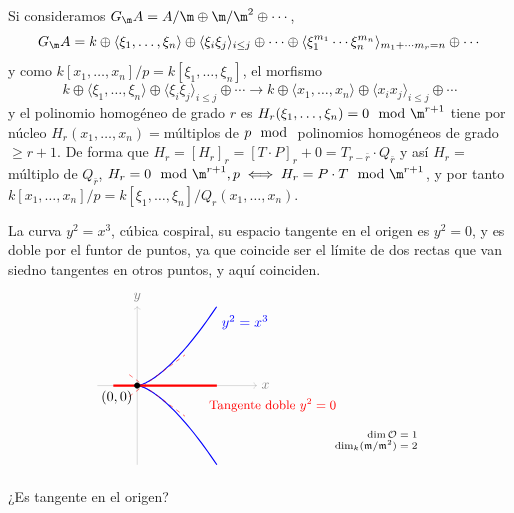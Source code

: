     Si consideramos $G_\m A = A/\m \oplus \m /\m^2 \oplus \cdots $, 
    $$G_\m A = k \oplus \langle \xi_1, \ldots, \xi_n \rangle \oplus \langle \xi_i \xi_j \rangle_{i \leq j} \oplus \cdots \oplus \langle \xi_1^{m_1} \cdots \xi_n^{m_n} \rangle_{m_1+\cdots m_r = n} \oplus \cdots $$
    y como $k[x_1, \ldots, x_n] / p = k[\xi_1, \ldots, \xi_n]$, el morfismo 
    $$k \oplus \langle \xi_1, \ldots, \xi_n \rangle \oplus \langle \xi_i \xi_j \rangle_{i \leq j} \oplus \cdots \longrightarrow k \oplus \langle x_1, \ldots, x_n \rangle \oplus \langle x_i x_j \rangle_{i \leq j} \oplus \cdots$$ 
    y el polinomio homog\'eneo de grado $r$ es $H_r(\xi_1, \ldots, \xi_n) = 0 \mod \m^{r+1}$  tiene por n\'ucleo $H_r(x_1, \ldots, x_n) = $m\'ultiplos de $p \mod$ polinomios homog\'eneos de grado $\ge r+1$. De forma que $H_r = [H_r]_r = [T \cdot P]_r + 0= T_{r-\bar r} \cdot Q_{\bar r} $ y as\'i $H_r = $ m\'ultiplo de $Q_{\bar r}$, $H_r = 0 \mod \m^{r+1}, p \iff H_r = P\cdot T \mod \m^{r+1}$, y por tanto $k[x_1, \ldots, x_n]/p = k[\xi_1, \ldots, \xi_n]/Q_r(x_1, \ldots, x_n)$. 
    \begin{ejem}
        La curva $y^2=x^3$, c\'ubica cospiral, su espacio tangente en el origen es $y^2=0$, y es doble por el funtor de puntos, ya que coincide ser el l\'imite de dos rectas que van siedno tangentes en otros puntos, y aqu\'i coinciden.
        $$\begin{tikzpicture}[scale=2]
            \draw[->, help lines] (-0.5,0) -- (1.5,0) node[right] {$x$};
            \draw[->, help lines] (0,-1) -- (0,1) node[above] {$y$};
        
            \draw[thick, blue, samples=100, domain=-1:1] plot ({\x*\x}, {\x*\x*\x});
            \node[blue, right] at (1,0.8) {$y^2=x^3$};
        
            \draw[red, dashed, domain=-0.1:0.6] plot (\x, {0.75*\x - 0.0625});
            \draw[red, dashed, domain=-0.1:0.6] plot (\x, {-0.75*\x + 0.0625});
            
            \draw[line width=1.5pt, red] (-0.3,0) -- (1,0);
            \node[red, below] at (1.7, -0.1) {\small Tangente doble $y^2=0$};
        
            \filldraw[black] (0,0) circle (1pt) node[anchor=north east] {$(0,0)$};
        
            \node[align=right, font=\scriptsize] at (3, -0.7) {
                $\dim \mathcal{O} = 1$ \\
                $\dim_k(\mathfrak{m}/\mathfrak{m}^2) = 2$ 
            };
        \end{tikzpicture}$$
    \end{ejem}
    ¿Es tangente en el origen?

